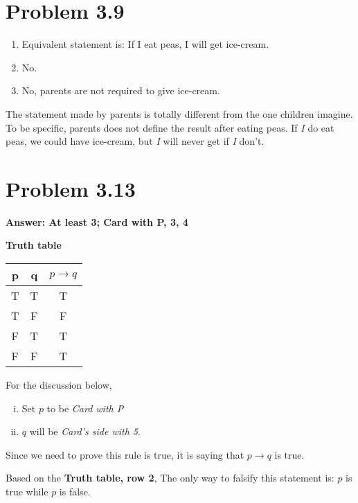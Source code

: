 \documentclass{article}
\def\math#1{$#1$}
\begin{document}
\section{Problem 3.9}

\begin{enumerate}
  \item Equivalent statement is: If I eat peas, I will get ice-cream.
  \item No.
  \item No, parents are not required to give ice-cream.
\end{enumerate}

The statement made by parents is totally different from the one children imagine. To be specific, parents does not define the result after eating peas. If \textit{I} do eat peas, we could have ice-cream, but \textit{I} will never get if \textit{I} don't.

\section{Problem 3.13}

\textbf{Answer: At least 3; Card with P, 3, 4}
\begin{center}
    \begin{center}
    \textbf{Truth table}
    \end{center}
    \begin{tabular}{|c|c|c|}
    \hline
    p  & q  & \math{p \to q} \\
    \hline
    T  & T  & T \\
    T  & F  & F \\
    F  & T  & T \\
    F  & F  & T \\
    \hline
    \end{tabular}
\end{center} 

For the discussion below, 
\begin{enumerate}[i.]
    \item Set \math{p} to be \textit{Card with P}
    \item \math{q} will be \textit{Card's side with 5}.
\end{enumerate}

Since we need to prove this rule is true, it is saying that \math{p \to q} is true.

Based on the \textbf{Truth table, row 2}, The only way to falsify this statement is: \math{p} is true while \math{p} is false.
\end{document}
